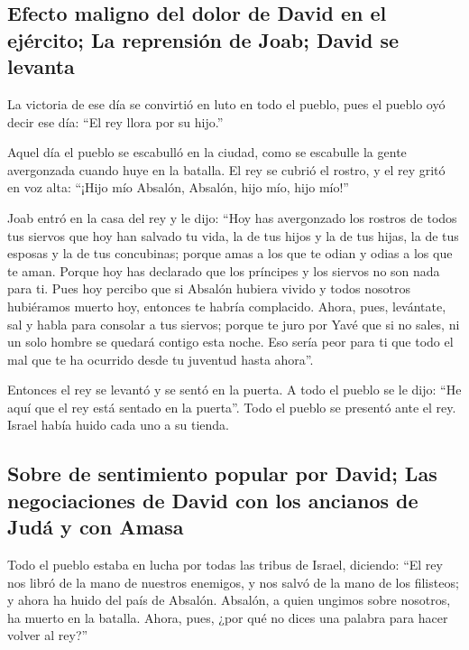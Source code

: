 \begin{paracol}{2}
{\subsection{Efecto maligno del dolor de David en el ejército; La
reprensión de Joab; David se
levanta}\label{efecto-maligno-del-dolor-de-david-en-el-ejuxe9rcito-la-reprensiuxf3n-de-joab-david-se-levanta}}

 La victoria de ese día se convirtió en luto en todo el
pueblo, pues el pueblo oyó decir ese día: ``El rey llora por su hijo.''

 Aquel día el pueblo se escabulló en la ciudad, como se
escabulle la gente avergonzada cuando huye en la batalla. 
El rey se cubrió el rostro, y el rey gritó en voz alta: ``¡Hijo mío
Absalón, Absalón, hijo mío, hijo mío!''

 Joab entró en la casa del rey y le dijo: ``Hoy has
avergonzado los rostros de todos tus siervos que hoy han salvado tu
vida, la de tus hijos y la de tus hijas, la de tus esposas y la de tus
concubinas;  porque amas a los que te odian y odias a los
que te aman. Porque hoy has declarado que los príncipes y los siervos no
son nada para ti. Pues hoy percibo que si Absalón hubiera vivido y todos
nosotros hubiéramos muerto hoy, entonces te habría complacido.
 Ahora, pues, levántate, sal y habla para consolar a tus
siervos; porque te juro por Yavé que si no sales, ni un solo hombre se
quedará contigo esta noche. Eso sería peor para ti que todo el mal que
te ha ocurrido desde tu juventud hasta ahora''.

 Entonces el rey se levantó y se sentó en la puerta. A
todo el pueblo se le dijo: ``He aquí que el rey está sentado en la
puerta''. Todo el pueblo se presentó ante el rey. Israel había huido
cada uno a su tienda.

\hypertarget{sobre-de-sentimiento-popular-por-david-las-negociaciones-de-david-con-los-ancianos-de-juduxe1-y-con-amasa}{%
\subsection{Sobre de sentimiento popular por David; Las negociaciones de
David con los ancianos de Judá y con
Amasa}\label{sobre-de-sentimiento-popular-por-david-las-negociaciones-de-david-con-los-ancianos-de-juduxe1-y-con-amasa}}

 Todo el pueblo estaba en lucha por todas las tribus de
Israel, diciendo: ``El rey nos libró de la mano de nuestros enemigos, y
nos salvó de la mano de los filisteos; y ahora ha huido del país de
Absalón.  Absalón, a quien ungimos sobre nosotros, ha
muerto en la batalla. Ahora, pues, ¿por qué no dices una palabra para
hacer volver al rey?''


\end{paracol}
